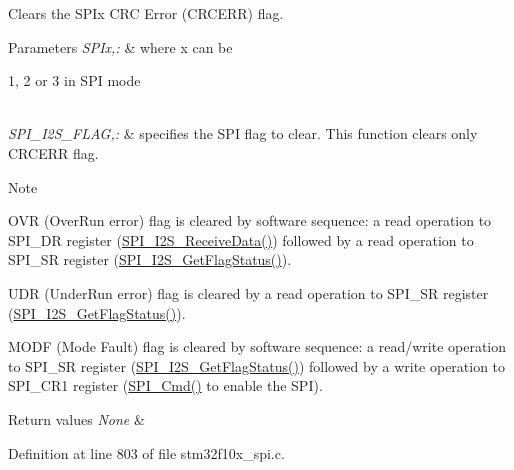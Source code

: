 Clears the S\-P\-Ix C\-R\-C Error (C\-R\-C\-E\-R\-R) flag. 


\begin{DoxyParams}{Parameters}
{\em S\-P\-Ix,\-:} & where x can be
\begin{DoxyItemize}
\item 1, 2 or 3 in S\-P\-I mode 
\end{DoxyItemize}\\
\hline
{\em S\-P\-I\-\_\-\-I2\-S\-\_\-\-F\-L\-A\-G,\-:} & specifies the S\-P\-I flag to clear. This function clears only C\-R\-C\-E\-R\-R flag. \\
\hline
\end{DoxyParams}
\begin{DoxyNote}{Note}

\begin{DoxyItemize}
\item O\-V\-R (Over\-Run error) flag is cleared by software sequence\-: a read operation to S\-P\-I\-\_\-\-D\-R register (\hyperlink{group___s_p_i___exported___functions_gab77de76547f3bff403236b263b070a30}{S\-P\-I\-\_\-\-I2\-S\-\_\-\-Receive\-Data()}) followed by a read operation to S\-P\-I\-\_\-\-S\-R register (\hyperlink{group___s_p_i___exported___functions_ga1bd785d129e09c5734a876c8f2767204}{S\-P\-I\-\_\-\-I2\-S\-\_\-\-Get\-Flag\-Status()}).
\item U\-D\-R (Under\-Run error) flag is cleared by a read operation to S\-P\-I\-\_\-\-S\-R register (\hyperlink{group___s_p_i___exported___functions_ga1bd785d129e09c5734a876c8f2767204}{S\-P\-I\-\_\-\-I2\-S\-\_\-\-Get\-Flag\-Status()}).
\item M\-O\-D\-F (Mode Fault) flag is cleared by software sequence\-: a read/write operation to S\-P\-I\-\_\-\-S\-R register (\hyperlink{group___s_p_i___exported___functions_ga1bd785d129e09c5734a876c8f2767204}{S\-P\-I\-\_\-\-I2\-S\-\_\-\-Get\-Flag\-Status()}) followed by a write operation to S\-P\-I\-\_\-\-C\-R1 register (\hyperlink{group___s_p_i___exported___functions_gaa31357879a65ee1ed7223f3b9114dcf3}{S\-P\-I\-\_\-\-Cmd()} to enable the S\-P\-I). 
\end{DoxyItemize}
\end{DoxyNote}

\begin{DoxyRetVals}{Return values}
{\em None} & \\
\hline
\end{DoxyRetVals}


Definition at line 803 of file stm32f10x\-\_\-spi.\-c.

